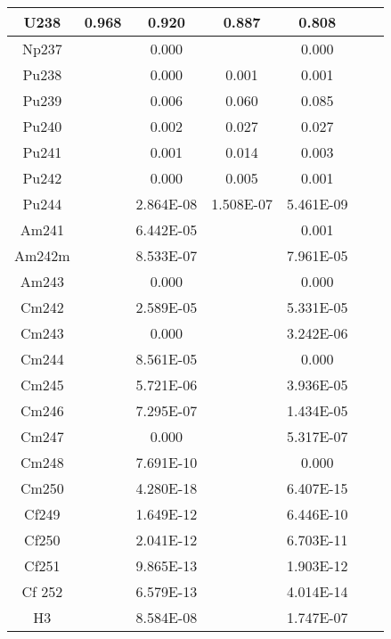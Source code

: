 \begin{frame}
\begin{table}[h]
{\begin{tabular}{|c|c|c|c|c|c|c|}
         U238    &  0.968&  0.920 &     0.887 &     0.808 \\ \hline 
         Np237   &      &   0.000 &          &  0.000 \\ \hline 
         Pu238   &      &   0.000 &     0.001 &     0.001 \\ \hline 
         Pu239   &      &   0.006 &     0.060 &     0.085 \\ \hline 
         Pu240   &      &   0.002 &     0.027 &     0.027 \\ \hline 
         Pu241   &      &   0.001 &     0.014 &     0.003 \\ \hline 
         Pu242   &      &   0.000 &     0.005 &     0.001 \\ \hline 
         Pu244   &      &   2.864E-08 & 1.508E-07 &     5.461E-09 \\ \hline 
         Am241   &      &   6.442E-05 &          &  0.001 \\ \hline 
         Am242m  &      &   8.533E-07 &          &  7.961E-05 \\ \hline 
         Am243   &      &   0.000 &          &  0.000 \\ \hline 
         Cm242   &      &   2.589E-05 &          &  5.331E-05 \\ \hline 
         Cm243   &      &   0.000 &          &  3.242E-06 \\ \hline 
         Cm244   &      &   8.561E-05 &          &  0.000 \\ \hline 
         Cm245   &      &   5.721E-06 &          &  3.936E-05 \\ \hline 
         Cm246   &      &   7.295E-07 &          &  1.434E-05 \\ \hline 
         Cm247   &      &   0.000 &          &  5.317E-07 \\ \hline 
         Cm248   &      &   7.691E-10 &          &  0.000 \\ \hline 
         Cm250   &      &   4.280E-18 &          &  6.407E-15 \\ \hline 
         Cf249   &      &   1.649E-12 &          &  6.446E-10 \\ \hline 
         Cf250   &      &   2.041E-12 &          &  6.703E-11 \\ \hline 
         Cf251   &      &   9.865E-13 &          &  1.903E-12 \\ \hline 
         Cf 252  &      &   6.579E-13 &          &  4.014E-14 \\ \hline 
         H3  &      &   8.584E-08 &          &  1.747E-07 \\ \hline 

\end{tabular}}
\end{table}
\end{frame}
